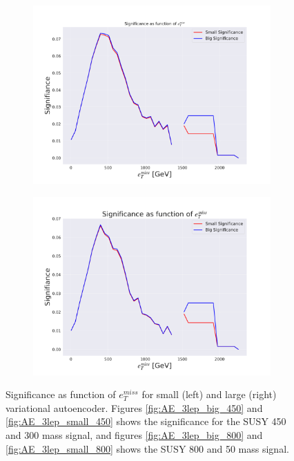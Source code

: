 \begin{figure}[H]
\begin{subfigure}{.45\textwidth}
        \includegraphics[width=\textwidth]{Figures/AE_testing/big/3lep/significance_etmiss_800p0p050p.pdf}
        \caption{}
        \label{fig:AE_3lep_big_800_signi}
    \end{subfigure}
    \hfill   
    \begin{subfigure}{.45\textwidth}
        \includegraphics[width=\textwidth]{Figures/AE_testing/small/3lep/significance_etmiss_800p0p050p.pdf}
        \caption{}
        \label{fig:AE_3lep_small_800_signi}
    \end{subfigure}
    \hfill      
    \caption[AE | Significance as function of $e_T^{miss}$]{Significance as function of $e_T^{miss}$ for small (left) and large (right) 
    variational autoencoder. Figures \ref{fig:AE_3lep_big_450} and \ref{fig:AE_3lep_small_450} shows the significance for the SUSY 450 
    and 300 mass signal, and figures \ref{fig:AE_3lep_big_800} and \ref{fig:AE_3lep_small_800} shows the SUSY 800 and 50 mass signal.}
    \label{fig:AE_3lep_recon_err_both_sig_signi}
\end{figure}



